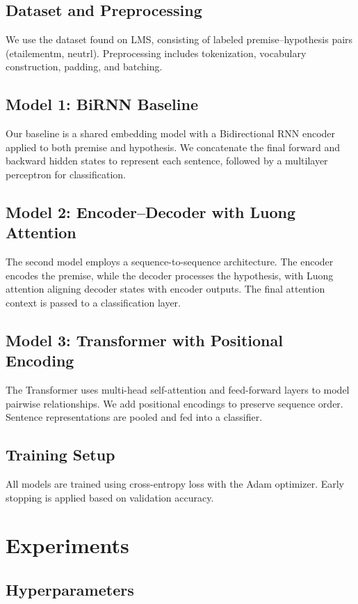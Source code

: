 \documentclass[11pt]{article}
\begin{document}
\subsection{Dataset and Preprocessing}
We use the dataset found on LMS, consisting of labeled premise–hypothesis pairs (etailementm, neutrl).  
Preprocessing includes tokenization, vocabulary construction, padding, and batching.

\subsection{Model 1: BiRNN Baseline}
Our baseline is a shared embedding model with a Bidirectional RNN encoder applied to both premise and hypothesis. We concatenate the final forward and backward hidden states to represent each sentence, followed by a multilayer perceptron for classification.

\subsection{Model 2: Encoder–Decoder with Luong Attention}
The second model employs a sequence-to-sequence architecture. The encoder encodes the premise, while the decoder processes the hypothesis, with Luong attention aligning decoder states with encoder outputs. The final attention context is passed to a classification layer.

\subsection{Model 3: Transformer with Positional Encoding}
The Transformer uses multi-head self-attention and feed-forward layers to model pairwise relationships. We add positional encodings to preserve sequence order. Sentence representations are pooled and fed into a classifier.

\subsection{Training Setup}
All models are trained using cross-entropy loss with the Adam optimizer. Early stopping is applied based on validation accuracy.

\section{Experiments}
\subsection{Hyperparameters}
\end{document}
